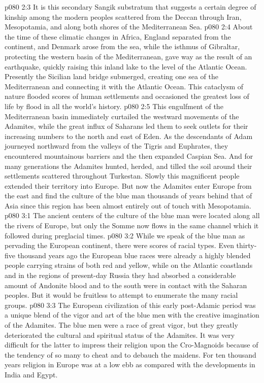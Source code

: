 \vs p080 2:3 It is this secondary Sangik substratum that suggests a certain degree of kinship among the modern peoples scattered from the Deccan through Iran, Mesopotamia, and along both shores of the Mediterranean Sea.
\pc \vs p080 2:4 About the time of these climatic changes in Africa, England separated from the continent, and Denmark arose from the sea, while the isthmus of Gibraltar, protecting the western basin of the Mediterranean, gave way as the result of an earthquake, quickly raising this inland lake to the level of the Atlantic Ocean. Presently the Sicilian land bridge submerged, creating one sea of the Mediterranean and connecting it with the Atlantic Ocean. This cataclysm of nature flooded scores of human settlements and occasioned the greatest loss of life by flood in all the world’s history.
\vs p080 2:5 This engulfment of the Mediterranean basin immediately curtailed the westward movements of the Adamites, while the great influx of Saharans led them to seek outlets for their increasing numbers to the north and east of Eden. As the descendants of Adam journeyed northward from the valleys of the Tigris and Euphrates, they encountered mountainous barriers and the then expanded Caspian Sea. And for many generations the Adamites hunted, herded, and tilled the soil around their settlements scattered throughout Turkestan. Slowly this magnificent people extended their territory into Europe. But now the Adamites enter Europe from the east and find the culture of the blue man thousands of years behind that of Asia since this region has been almost entirely out of touch with Mesopotamia.\plusone
{}
\vs p080 3:1 The ancient centers of the culture of the blue man were located along all the rivers of Europe, but only the Somme now flows in the same channel which it followed during preglacial times.
\vs p080 3:2 While we speak of the blue man as pervading the European continent, there were scores of racial types. Even thirty\hyp{}five thousand years ago the European blue races were already a highly blended people carrying strains of both red and yellow, while on the Atlantic coastlands and in the regions of present\hyp{}day Russia they had absorbed a considerable amount of Andonite blood and to the south were in contact with the Saharan peoples. But it would be fruitless to attempt to enumerate the many racial groups.
\vs p080 3:3 The European civilization of this early post\hyp{}Adamic period was a unique blend of the vigor and art of the blue men with the creative imagination of the Adamites. The blue men were a race of great vigor, but they greatly deteriorated the cultural and spiritual status of the Adamites. It was very difficult for the latter to impress their religion upon the Cro\hyp{}Magnoids because of the tendency of so many to cheat and to debauch the maidens. For ten thousand years religion in Europe was at a low ebb as compared with the developments in India and Egypt.
